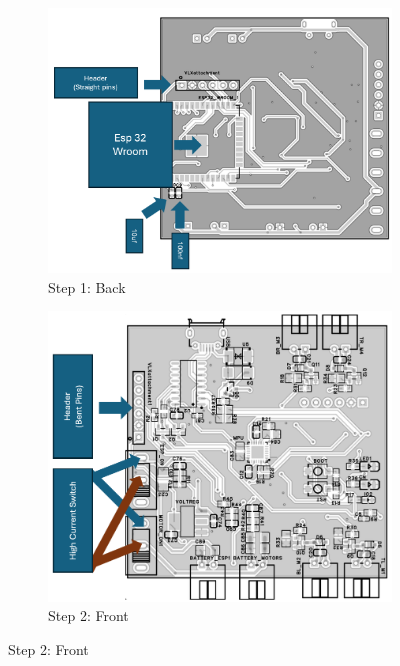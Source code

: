 \begin{figure}[H]
  \centering
  \begin{subfigure}[b]{0.48\linewidth}
    \centering
    \includegraphics[width=\linewidth]{img/assembly-1.png}
    \caption{Step 1: Back}
  \end{subfigure}
  \hfill
  \begin{subfigure}[b]{0.48\linewidth}
    \centering
    \includegraphics[width=\linewidth]{img/assembly-2.png}
    \caption{Step 2: Front}
  \end{subfigure}
\end{figure}

